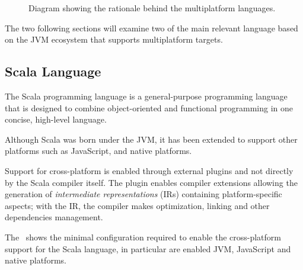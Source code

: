 \begin{figure}[h]
	\centering
	\caption{Diagram showing the rationale behind the multiplatform languages.}
	\label{fig:mulitplatform-languages}
\end{figure}

The two following sections will examine two of the main relevant language based on the JVM ecosystem that supports multiplatform targets.

\subsection{Scala Language}
\label{sec:scala-language}

The Scala programming language is a general-purpose programming language that is designed to combine object-oriented and functional programming in one
concise, high-level language.

Although Scala was born under the JVM, it has been extended to support other platforms such as JavaScript, and native platforms.

Support for cross-platform is enabled through external plugins and not directly by the Scala compiler itself.
The plugin enables compiler extensions allowing the generation of \emph{intermediate representations} (IRs) containing platform-specific aspects;
with the IR, the compiler makes optimization, linking and other dependencies management.

The~ shows the minimal configuration required to enable the cross-platform support for the Scala language,
in particular are enabled JVM, JavaScript and native platforms.




